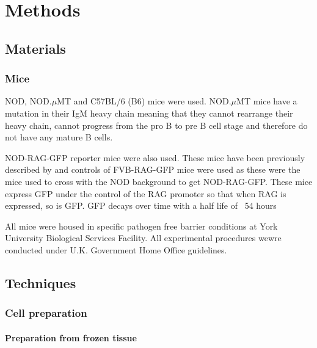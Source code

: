 
\chapter{Methods}

\section{Materials}

\subsection{Mice}
\label{methods:mice}

NOD, NOD.$\mu$MT  and C57BL/6 (B6) mice were used.
NOD.$\mu$MT mice have a mutation in their IgM heavy chain meaning that they cannot rearrange their heavy chain, cannot progress from the pro B to pre B cell stage and therefore do not have any mature B cells.

NOD-RAG-GFP reporter mice were also used.
These mice have been previously described by  and controls of FVB-RAG-GFP mice were used as these were the mice used to cross with the NOD background to get NOD-RAG-GFP.
These mice express GFP under the control of the RAG promoter so that when RAG is expressed, so is GFP.
GFP decays over time with a half life of ~54 hours 

All mice were housed in specific pathogen free barrier conditions at York University Biological Services Facility. 
All experimental procedures wewre conducted under U.K. Government Home Office guidelines.



\section{Techniques}

\subsection{Cell preparation}

\subsubsection{Preparation from frozen tissue}

